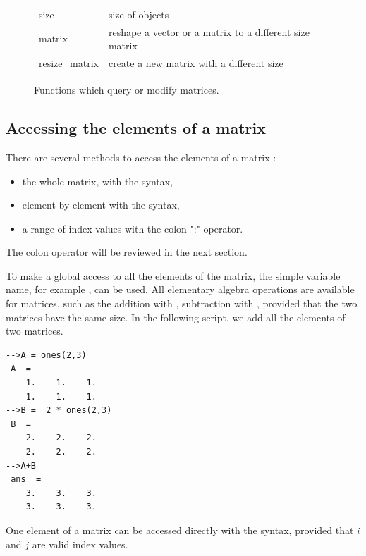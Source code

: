 \begin{figure}
\begin{center}
\begin{tabular}{|ll|}
\hline
size & size of objects \\
matrix & reshape a vector or a matrix to a different size matrix \\
resize\_matrix & create a new matrix with a different size \\
\hline
\end{tabular}
\end{center}
\caption{Functions which query or modify matrices.}
\label{fig-introscilab-querymatrix}
\end{figure}

\subsection{Accessing the elements of a matrix}
There are several methods to access the elements of a 
matrix :
\begin{itemize}
\item the whole matrix, with the  syntax,
\item element by element with the  syntax,
\item a range of index values with the colon ":" operator.
\end{itemize}
The colon operator will be reviewed in the next section.

To make a global access to all the elements of the matrix, the 
simple variable name, for example , can be used.
All elementary algebra operations are available for matrices, such 
as the addition with \scifun{+}, subtraction with \scifun{-},
provided that the two matrices have the same size.
In the following script, we add all the elements of two matrices.
\lstset{language=scilabscript}
\begin{lstlisting}
-->A = ones(2,3)
 A  =
    1.    1.    1.  
    1.    1.    1.  
-->B =  2 * ones(2,3)
 B  =
    2.    2.    2.  
    2.    2.    2.  
-->A+B
 ans  =
    3.    3.    3.  
    3.    3.    3.  
\end{lstlisting}

One element of a matrix can be accessed directly with the  syntax,
provided that $i$ and $j$ are valid index values.

